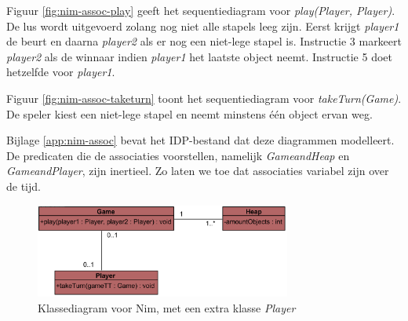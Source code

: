 Figuur \ref{fig:nim-assoc-play} geeft het sequentiediagram voor \textit{play(Player, Player)}. De lus wordt uitgevoerd zolang nog niet alle stapels leeg zijn. Eerst krijgt \textit{player1} de beurt en daarna \textit{player2} als er nog een niet-lege stapel is. Instructie 3 markeert \textit{player2} als de winnaar indien \textit{player1} het laatste object neemt. Instructie 5 doet hetzelfde voor \textit{player1}.

Figuur \ref{fig:nim-assoc-taketurn} toont het sequentiediagram voor \textit{takeTurn(Game)}. De speler kiest een niet-lege stapel en neemt minstens \'e\'en object ervan weg.

Bijlage \ref{app:nim-assoc} bevat het IDP-bestand dat deze diagrammen modelleert. De predicaten die de associaties voorstellen, namelijk \textit{GameandHeap} en \textit{GameandPlayer}, zijn inertieel. Zo laten we toe dat associaties variabel zijn over de tijd.

\begin{figure}
	\centering
	\includegraphics[width=0.75\textwidth]{chap-declaratieve-seq/nim-assoc-cd.png}
	\caption{Klassediagram voor Nim, met een extra klasse \textit{Player}}
	\label{fig:nim-assoc-cd}
\end{figure}

